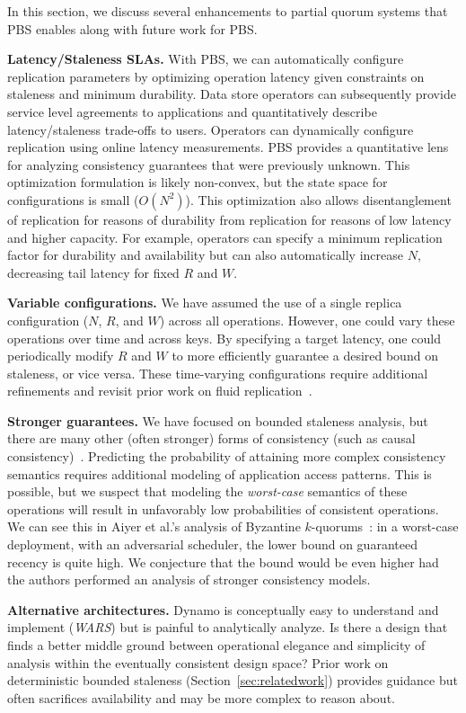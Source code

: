 \documentclass{vldb}
\begin{document}
In this section, we discuss several enhancements to partial
quorum systems that PBS enables along with future work for PBS.

\textbf{Latency/Staleness SLAs.} With PBS, we can automatically
configure replication parameters by optimizing operation latency given
constraints on staleness and minimum durability.  Data store operators
can subsequently provide service level agreements to applications and
quantitatively describe latency/staleness trade-offs to users.
Operators can dynamically configure replication using online latency
measurements.  PBS provides a quantitative lens for analyzing
consistency guarantees that were previously unknown.  This
optimization formulation is likely non-convex, but the state space for
configurations is small ($O(N^2)$).  This optimization also allows
disentanglement of replication for reasons of durability from
replication for reasons of low latency and higher capacity.  For
example, operators can specify a minimum replication factor for
durability and availability but can also automatically increase
$N$, decreasing tail latency for fixed $R$ and $W$.

\textbf{Variable configurations.} We have assumed the use of a single
replica configuration ($N$, $R$, and $W$) across all operations.
However, one could vary these operations over time and across keys.
By specifying a target latency, one could periodically modify $R$ and
$W$ to more efficiently guarantee a desired bound on staleness, or
vice versa. These time-varying configurations require additional
refinements and revisit prior work on fluid
replication~\cite{fluidreplication}.

\textbf{Stronger guarantees.} We have focused on bounded staleness
analysis, but there are many other (often stronger) forms of
consistency (such as causal consistency)~\cite{vogels-defs}.
Predicting the probability of attaining more complex consistency
semantics requires additional modeling of application access patterns.
This is possible, but we suspect that modeling the \textit{worst-case}
semantics of these operations will result in unfavorably low
probabilities of consistent operations.  We can see this in Aiyer et
al.'s analysis of Byzantine $k$-quorums~\cite{multi-k-quorum}: in a
worst-case deployment, with an adversarial scheduler, the lower bound
on guaranteed recency is quite high.  We conjecture that the bound
would be even higher had the authors performed an analysis of stronger
consistency models.

\textbf{Alternative architectures.} Dynamo is conceptually easy to
understand and implement (\textit{WARS}) but is painful to
analytically analyze.  Is there a design that finds a better middle
ground between operational elegance and simplicity of analysis within
the eventually consistent design space?  Prior work on deterministic
bounded staleness (Section~\ref{sec:relatedwork}) provides guidance
but often sacrifices availability and may be more complex to reason
about.
\end{document}
